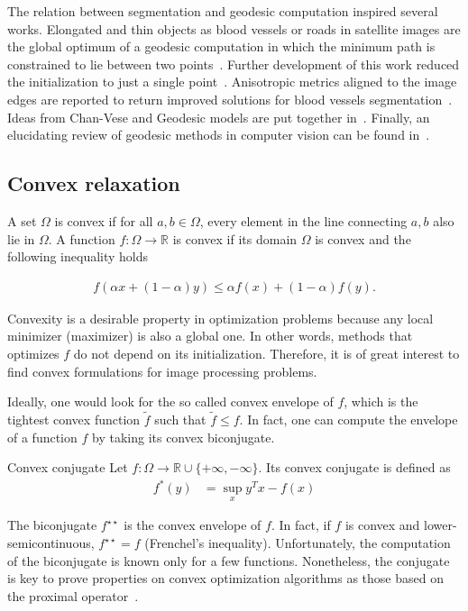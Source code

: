 The relation between segmentation and geodesic computation inspired several works. Elongated and thin objects as blood vessels or roads in satellite images are the global optimum of a geodesic computation in which the minimum path is constrained to lie between two points~\cite{cohen97}. Further development of this work reduced the initialization to just a single point~\cite{benmansour09}. Anisotropic metrics aligned to the image edges are reported to return improved solutions for blood vessels segmentation~\cite{jbabdi08,benmansour11}. Ideas from Chan-Vese and Geodesic models are put together in~\cite{chen06}. Finally, an elucidating review of geodesic methods in computer vision can be found in~\cite{peyre10}.

\subsection{Convex relaxation}

A set $\Omega$ is convex if for all $a,b \in \Omega$, every element in the line connecting $a,b$ also lie in $\Omega$. A function $f:\Omega \rightarrow \mathbb{R}$  is convex if its domain $\Omega$ is convex and the following inequality holds

\begin{align*}
	f(\alpha x + (1-\alpha)y) \leq \alpha f(x) + (1-\alpha)f(y).
\end{align*}

Convexity is a desirable property in optimization problems because any local minimizer (maximizer) is also a global one. In other words, methods that optimizes $f$ do not depend on its initialization. Therefore, it is of great interest to find convex formulations for image processing problems.

Ideally, one would look for the so called convex envelope of $f$, which is the tightest convex function $\widetilde{f}$ such that $\widetilde{f} \leq f$. In fact, one can compute the envelope of a function $f$ by taking its convex biconjugate.

\begin{definition}{Convex conjugate}
	Let $f:\Omega \rightarrow \mathbb{R} \cup \{ +\infty, -\infty\}$. Its convex conjugate is defined as
	\begin{align*}
		f^{*}(y) &= \sup_x y^{T}x - f(x)
	\end{align*}
\end{definition}

The biconjugate $f^{\star \star}$ is the convex envelope of $f$. In fact, if $f$ is convex and lower-semicontinuous, $f^{\star \star}=f$ (Frenchel's inequality). Unfortunately, the computation of the biconjugate is known only for a few functions. Nonetheless, the conjugate is key to prove properties on convex optimization algorithms as those based on the proximal operator~\cite{chambolle04,beck09a}. 



